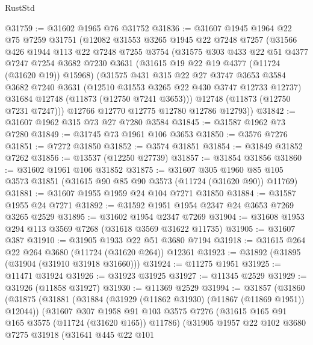 \begin{lexlean}{RustStd}
\begin{coremodule}
@31759 := @31602 @1965 @76 @31752
@31836 := @31607
    @1945
    @1964
    @22
    @75
    @7259
    @31751
    (@12082
      @31553
      @3265
      @1945
      @22
      @7248
      @7257
      (@31566
        @426
        @1944
        @113
        @22
        @7248
        @7255
        @3754
        (@31575
          @303
          @433
          @22
          @51
          @4377
          @7247
          @7254
          @3682
          @7230
          @3631
          (@31615 @19 @22 @19 @4377 (@11724 (@31620 @19)) @15968)
          (@31575
            @431
            @315
            @22
            @27
            @3747
            @3653
            @3584
            @3682
            @7240
            @3631
            (@12510 @31553 @3265 @22 @430 @3747 @12733 @12737)
            @31684
            @12748
            (@11873 (@12750 @7241 @3653)))
          @12748
          (@11873 (@12750 @7231 @7247)))
        @12766
        @12770
        @12775
        @12780
        @12786
        @12793))
@31842 := @31607 @1962 @315 @73 @27 @7280 @3584
@31845 := @31587 @1962 @73 @7280
@31849 := @31745 @73 @1961 @106 @3653
@31850 := @3576 @7276
@31851 := @7272 @31850
@31852 := @3574 @31851
@31854 := @31849 @31852 @7262
@31856 := @13537 (@12250 @27739)
@31857 := @31854 @31856
@31860 := @31602 @1961 @106 @31852
@31875 := @31607
    @305
    @1960
    @85
    @105
    @3573
    @31851
    (@31615 @90 @85 @90 @3573 (@11724 (@31620 @90)) @11769)
@31881 := @31607 @1955 @1959 @24 @104 @7271 @31850
@31884 := @31587 @1955 @24 @7271
@31892 := @31592 @1951 @1954 @2347 @24 @3653 @7269 @3265 @2529
@31895 := @31602 @1954 @2347 @7269
@31904 := @31608 @1953 @294 @113 @3569 @7268 (@31618 @3569 @31622 @11735)
@31905 := @31607 @387
@31910 := @31905 @1933 @22 @51 @3680 @7194
@31918 := @31615 @264 @22 @264 @3680 (@11724 (@31620 @264)) @12361
@31923 := @31892 (@31895 (@31904 (@31910 @31918 @31660)))
@31924 := @11275 @1951
@31925 := @11471 @31924
@31926 := @31923 @31925
@31927 := @11345 @2529
@31929 := @31926 (@11858 @31927)
@31930 := @11369 @2529
@31994 := @31857
    (@31860
      (@31875
        (@31881
          (@31884 (@31929 (@11862 @31930) (@11867 (@11869 @1951)) @12044))
          (@31607
            @307
            @1958
            @91
            @103
            @3575
            @7276
            (@31615 @165 @91 @165 @3575 (@11724 (@31620 @165)) @11786)
            (@31905
              @1957
              @22
              @102
              @3680
              @7275
              @31918
              (@31641
                @445
                @22
                @101

\end{coremodule}
\end{lexlean}
